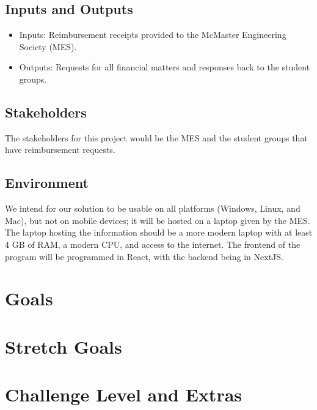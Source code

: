 \documentclass{article}
\begin{document}
\subsection{Inputs and Outputs}

\begin{itemize}
    \item Inputs: Reimbursement receipts provided to the McMaster Engineering Society (MES).
    \item Outputs: Requests for all financial matters and responses back to the student groups.
\end{itemize}

\subsection{Stakeholders}

\hspace{0.5cm} The stakeholders for this project would be the MES and the student groups that have reimbursement requests. 

\subsection{Environment}

\hspace{0.5cm} We intend for our solution to be usable on all platforms (Windows, Linux, and Mac), but not on mobile devices; it will be hosted on a laptop given by the MES. The laptop hosting the information should be a more modern laptop with at least 4 GB of RAM, a modern CPU, and access to the internet. The frontend of the program will be programmed in React, with the backend being in NextJS.

\section{Goals}

\section{Stretch Goals}

\section{Challenge Level and Extras}

\end{document}
